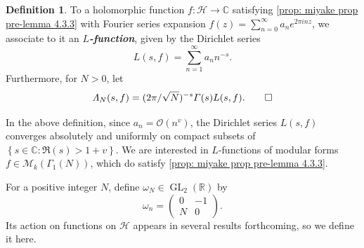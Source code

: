 \documentclass[10pt,leqno,twoside]{article}
\theoremstyle{plain}
\theoremstyle{definition}
\newtheorem{definition/}[lem]{Definition}
\newenvironment{definition}
  {\renewcommand{\qedsymbol}{\textdagger}%
   \pushQED{\qed}\begin{definition/}}
  {\popQED\end{definition/}}
\numberwithin{equation}{section}
\numberwithin{lem}{section}
\newcommand{\cbr}[1]{\left\{#1\right\}}
\newcommand{\textib}[1]{\textbf{\textit{#1\index{#1}}}} %
\DeclareMathOperator{\GL}{GL}
\begin{document}
\begin{definition}\label{def: L function}
    To a holomorphic function $f\colon \mathcal H\to \mathbb C$ satisfying \cref{prop: miyake prop pre-lemma 4.3.3}  with Fourier series expansion $f(z) = \sum_{n=0}^\infty a_ne^{2\pi i nz}$, we associate to it an \textib{$L$-function}, given by the Dirichlet series
    \[L(s,f) = \sum_{n=1}^\infty a_nn^{-s}.\] Furthermore, for $N>0$, let 
    \[\varLambda_N(s,f) = (2\pi/\sqrt{N})^{-s}\varGamma(s)L(s,f).\qedhere\]
\end{definition}

In the above definition, since $a_n = \mathcal O(n^v)$, the Dirichlet series $L(s,f)$ converges absolutely and uniformly on compact subsets of $\cbr{s\in\mathbb C : \Re(s)>1+v}$. We are interested in $L$-functions of modular forms $f\in\mathcal M_k(\varGamma_1(N))$, which do satisfy \cref{prop: miyake prop pre-lemma 4.3.3}. 

For a positive integer $N$, define \textib{$\omega_N$}$\in\GL_2(\mathbb R)$ by 
\[\omega_n = \begin{pmatrix}
    0 & -1 \\ N & 0
\end{pmatrix}.\]
Its action on functions on $\mathcal H$ appears in several results forthcoming, so we define it here.
\end{document}
